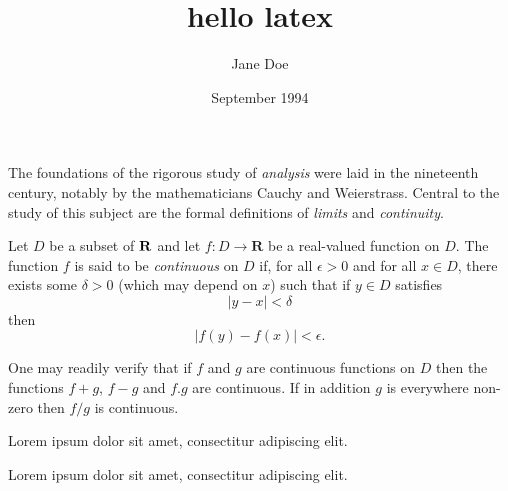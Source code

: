 \documentclass[a4paper,12pt]{article}
\title{hello latex}
\author{Jane Doe}
\date{September 1994}
\begin{document}
	\maketitle

The foundations of the rigorous study of \emph{analysis}
were laid in the nineteenth century, notably by the
mathematicians Cauchy and Weierstrass. Central to the
study of this subject are the formal definitions of
\emph{limits} and \emph{continuity}.

Let $D$ be a subset of $\bf R$ and let
$f \colon D \to \mathbf{R}$ be a real-valued function on
$D$. The function $f$ is said to be \emph{continuous} on
$D$ if, for all $\epsilon > 0$ and for all $x \in D$,
there exists some $\delta > 0$ (which may depend on $x$)
such that if $y \in D$ satisfies
\[ |y - x| < \delta \]
then
\[ |f(y) - f(x)| < \epsilon. \]

One may readily verify that if $f$ and $g$ are continuous
functions on $D$ then the functions $f+g$, $f-g$ and
$f.g$ are continuous. If in addition $g$ is everywhere
non-zero then $f/g$ is continuous.

\renewcommand{\familydefault}{\sfdefault}
Lorem ipsum dolor sit amet, consectitur adipiscing elit.
 
\renewcommand*\rmdefault{ppl}\normalfont\upshape
Lorem ipsum dolor sit amet, consectitur adipiscing elit. %
 
\renewcommand*\rmdefault{iwona}\normalfont\upshape
\end{document}
